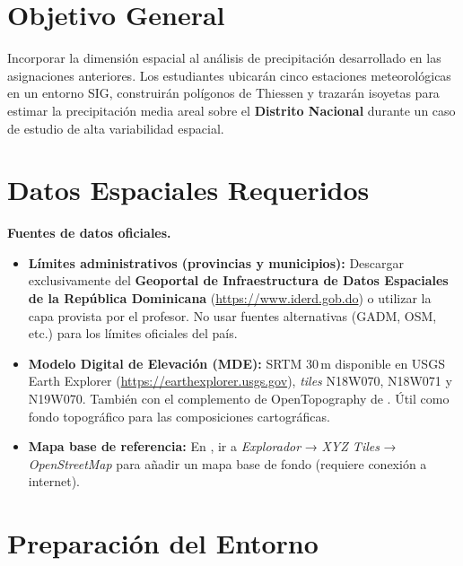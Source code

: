 \documentclass[11pt]{article}
\begin{document}
\section*{Objetivo General}

Incorporar la dimensión espacial al análisis de precipitación desarrollado en las
asignaciones anteriores. Los estudiantes ubicarán cinco estaciones meteorológicas
en un entorno SIG, construirán polígonos de Thiessen y trazarán isoyetas para
estimar la precipitación media areal sobre el \textbf{Distrito Nacional} durante
un caso de estudio de alta variabilidad espacial.

\section*{Datos Espaciales Requeridos}

\begin{olivebox}
\textbf{Fuentes de datos oficiales.}
\begin{itemize}
  \item \textbf{Límites administrativos (provincias y municipios):}
    Descargar exclusivamente del \textbf{Geoportal de Infraestructura de Datos
    Espaciales de la República Dominicana} (\url{https://www.iderd.gob.do}) o
    utilizar la capa provista por el profesor.
    No usar fuentes alternativas (GADM, OSM, etc.) para los límites oficiales del país.

  \item \textbf{Modelo Digital de Elevación (MDE):}
    SRTM 30\,m disponible en USGS Earth Explorer
    (\url{https://earthexplorer.usgs.gov}), \emph{tiles} N18W070, N18W071 y N19W070. 
    También con el complemento de OpenTopography de \qgis{}.
    Útil como fondo topográfico para las composiciones cartográficas.

  \item \textbf{Mapa base de referencia:}
    En \qgis{}, ir a \emph{Explorador} → \emph{XYZ Tiles} → \emph{OpenStreetMap}
    para añadir un mapa base de fondo (requiere conexión a internet).
\end{itemize}
\end{olivebox}

\section*{Preparación del Entorno \qgis{}}
\end{document}
